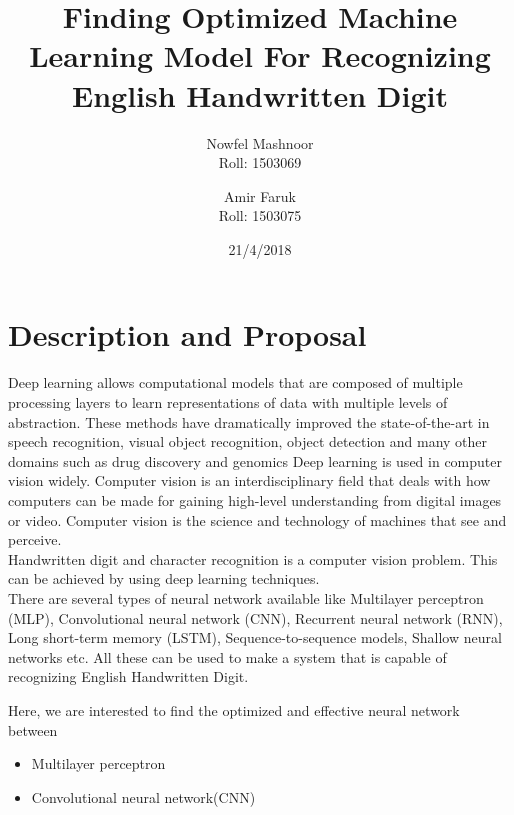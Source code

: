 \documentclass[12pt,a4paper]{article}
\title{Finding Optimized Machine Learning Model For Recognizing English Handwritten Digit}
\author{Nowfel Mashnoor\\Roll: 1503069\and Amir Faruk\\Roll: 1503075}
\date{21/4/2018}
\begin{document}
\maketitle

\section{Description and Proposal}

Deep learning allows computational models that are composed of multiple processing layers to learn representations of data with multiple levels of abstraction. These methods have dramatically improved the state-of-the-art in speech recognition, visual object recognition, object detection and many other domains such as drug discovery and genomics\cite{DUMMY:1}
Deep learning is used in computer vision widely. Computer vision is an interdisciplinary field that deals with how computers can be made for gaining high-level understanding from digital images or video. Computer vision is the science and technology of machines that see and perceive.\cite{schalkoff1989digital}
\\Handwritten digit and character recognition is a  computer vision problem. This can be achieved by using deep learning techniques.\\There are several types of neural network available like Multilayer perceptron (MLP), Convolutional neural network (CNN)\cite{bouvrie2006notes}, Recurrent neural network (RNN), Long short-term memory (LSTM), Sequence-to-sequence models, Shallow neural networks etc. All these can be used to make a system that is capable of recognizing English Handwritten Digit.

Here, we are interested to find the optimized and effective neural network between
\begin{itemize}
  \item Multilayer perceptron
  \item Convolutional neural network(CNN)
\end{itemize}

 

\end{document}
